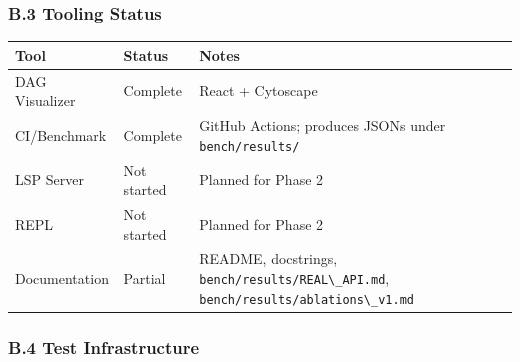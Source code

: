 \documentclass[
]{article}
\newcommand{\passthrough}[1]{#1}
\newcounter{none} %
\begin{document}
\subsubsection{B.3 Tooling Status}\label{b.3-tooling-status}

{\def\LTcaptype{none} %
\begin{longtable}[]{@{}
  >{\raggedright\arraybackslash}p{}
  >{\raggedright\arraybackslash}p{}
  >{\raggedright\arraybackslash}p{}@{}}
\toprule\noalign{}
\begin{minipage}[b]{\linewidth}\raggedright
Tool
\end{minipage} & \begin{minipage}[b]{\linewidth}\raggedright
Status
\end{minipage} & \begin{minipage}[b]{\linewidth}\raggedright
Notes
\end{minipage} \\
\midrule\noalign{}
\endhead
\bottomrule\noalign{}
\endlastfoot
DAG Visualizer & Complete & React + Cytoscape \\
CI/Benchmark & Complete & GitHub Actions; produces JSONs under
\passthrough{\lstinline!bench/results/!} \\
LSP Server & Not started & Planned for Phase 2 \\
REPL & Not started & Planned for Phase 2 \\
Documentation & Partial & README, docstrings,
\passthrough{\lstinline!bench/results/REAL\_API.md!},
\passthrough{\lstinline!bench/results/ablations\_v1.md!} \\
\end{longtable}
}

\subsubsection{B.4 Test Infrastructure}\label{b.4-test-infrastructure}
\end{document}
